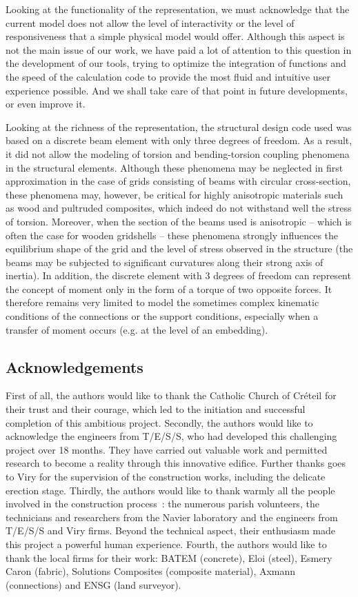 Looking at the functionality of the representation, we must acknowledge that the current model does not allow the level of interactivity or the level of responsiveness that a simple physical model would offer. Although this aspect is not the main issue of our work, we have paid a lot of attention to this question in the development of our tools, trying to optimize the integration of functions and the speed of the calculation code to provide the most fluid and intuitive user experience possible. And we shall take care of that point in future developments, or even improve it.

Looking at the richness of the representation, the structural design code used was based on a discrete beam element with only three degrees of freedom. As a result, it did not allow the modeling of torsion and bending-torsion coupling phenomena in the structural elements. Although these phenomena may be neglected in first approximation in the case of grids consisting of beams with circular cross-section, these phenomena may, however, be critical for highly anisotropic materials such as wood and pultruded composites, which indeed do not withstand well the stress of torsion. Moreover, when the section of the beams used is anisotropic -- which is often the case for wooden gridshells -- these phenomena strongly influences the equilibrium shape of the grid and the level of stress observed in the structure (the beams may be subjected to significant curvatures along their strong axis of inertia). In addition, the discrete element with 3 degrees of freedom can represent the concept of moment only in the form of a torque of two opposite forces. It therefore remains very limited to model the sometimes complex kinematic conditions of the connections or the support conditions, especially when a transfer of moment occurs (e.g. at the level of an embedding).

\subsection*{Acknowledgements}
First of all, the authors would like to thank the Catholic Church of Créteil for their trust and their courage, which led to the initiation and successful completion of this ambitious project. Secondly, the authors would like to acknowledge the engineers from T/E/S/S, who had developed this challenging project over 18 months. They have carried out valuable work and permitted research to become a reality through this innovative edifice. Further thanks goes to Viry for the supervision of the construction works, including the delicate erection stage. Thirdly, the authors would like to thank warmly all the people involved in the construction process~: the numerous parish volunteers, the technicians and researchers from the Navier laboratory and the engineers from T/E/S/S and Viry firms. Beyond the technical aspect, their enthusiasm made this project a powerful human experience. Fourth, the authors would like to thank the local firms for their work: BATEM (concrete), Eloi (steel), Esmery Caron (fabric), Solutions Composites (composite material), Axmann (connections) and ENSG (land surveyor).